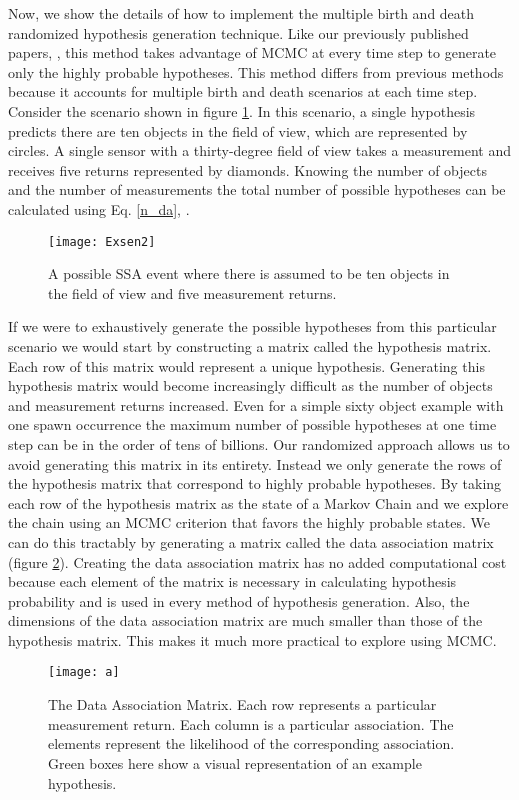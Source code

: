 \documentclass[10pt, conference]{IEEEtran}
\begin{document}
Now, we show the details of how to implement the multiple birth and death randomized hypothesis generation technique. Like our previously published papers, \cite{Faber1,Faber2}, this method takes advantage of MCMC at every time step to generate only the highly probable hypotheses. This method differs from previous methods because it accounts for multiple birth and death scenarios at each time step. Consider the scenario shown in figure \ref{EXsen}. In this scenario, a single hypothesis predicts there are ten objects in the field of view, which are represented by circles. A single sensor with a thirty-degree field of view takes a measurement and receives five returns represented by diamonds. Knowing the number of objects  and the number of measurements  the total number of possible hypotheses can be calculated using Eq. \eqref{n_da}, .
\begin{figure}[h]
\centering
\texttt{[image: Exsen2]}
\caption{A possible SSA event where there is assumed to be ten objects in the field of view and five measurement returns.}
\label{EXsen}
\end{figure}
If we were to exhaustively generate the possible hypotheses from this particular scenario we would start by constructing a matrix called the hypothesis matrix. Each row of this matrix would represent a unique hypothesis. Generating this hypothesis matrix would become increasingly difficult as the number of objects and measurement returns increased. Even for a simple sixty object example with one spawn occurrence the maximum number of possible hypotheses at one time step can be in the order of tens of billions. Our randomized approach allows us to avoid generating this matrix in its entirety. Instead we only generate the rows of the hypothesis matrix that correspond to highly probable hypotheses. By taking each row of the hypothesis matrix as the state of a Markov Chain and we explore the chain using an MCMC criterion that favors the highly probable states. 
We can do this tractably by generating a matrix called the data association matrix (figure \ref{da}). Creating the data association matrix has no added computational cost because each element of the matrix is necessary in calculating hypothesis probability and is used in every method of hypothesis generation. Also, the dimensions of the data association matrix are much smaller than those of the hypothesis matrix. This makes it much more practical to explore using MCMC.  
\begin{figure}[h]
\centering
\texttt{[image: a]}
\caption{The Data Association Matrix. Each row represents a particular measurement return. Each column is a particular association. The elements represent the likelihood of the corresponding association. Green boxes here show a visual representation of an example hypothesis.}
\label{da}
\end{figure}
\end{document}
